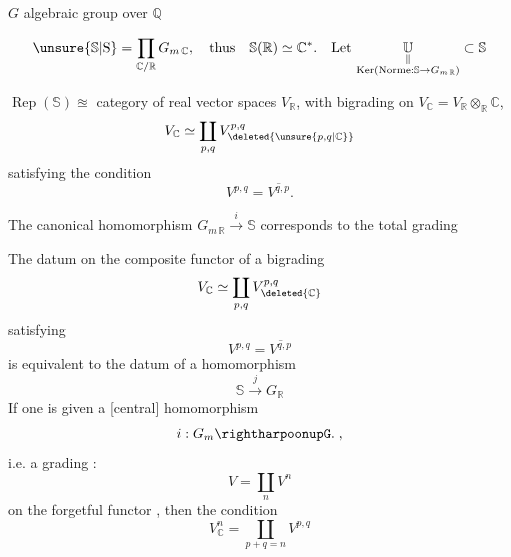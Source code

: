 $G$ algebraic group over $\mathbb{Q}$

\[
\unsure{\mathbb{S}|\mathrm{S}}=\prod_{\mathbb{C}/\mathbb{R}}G_{m\,\mathbb{C}},\quad
\text{thus}\quad \mathbb{S}(\mathbb{R})\simeq\mathbb{C}^{*}.\quad
\text{Let }\underset{\substack{\Vert\\
\operatorname{Ker}(\mathrm{Norme}:\mathbb{S}\to G_{m\,\mathbb{R}})}}{\mathbb{U}}\subset\mathbb{S}
\]

$\operatorname{Rep}(\mathbb{S})\approxeq$ category of real vector spaces $V_{\mathbb{R}}$, with bigrading on $V_{\mathbb{C}}=V_{\mathbb{R}}\otimes_{\mathbb{R}}\mathbb{C}$,
\[
V_{\mathbb{C}}\simeq\coprod_{p,q}V_{\deleted{\unsure{p,q|\mathbb{C}}}}^{p,q}
\]
satisfying the condition
\[
V^{p,q}=\overline{V^{q,p}}.
\]

The canonical homomorphism $G_{m\,\mathbb{R}}\xrightarrow{i}\mathbb{S}$ corresponds to the total grading


The datum on the composite functor of a bigrading
\[
V_{\mathbb{C}}\simeq\coprod_{p,q}V_{\deleted{\mathbb{C}}}^{p,q}
\]
satisfying
\[
V^{p,q}=\overline{V^{q,p}}
\]
is equivalent to the datum of a homomorphism
\[
\mathbb{S}\xrightarrow{j}G_{\mathbb{R}}
\]
If one is given a [central] homomorphism
\[
i:G_m\rightharpoonupG.\;,
\]
i.e. a grading :
\[
V=\coprod_n V^n
\]
on the forgetful functor , then the condition
\[
V^n_{\mathbb{C}}=\coprod_{p+q=n}V^{p,q}
\]

